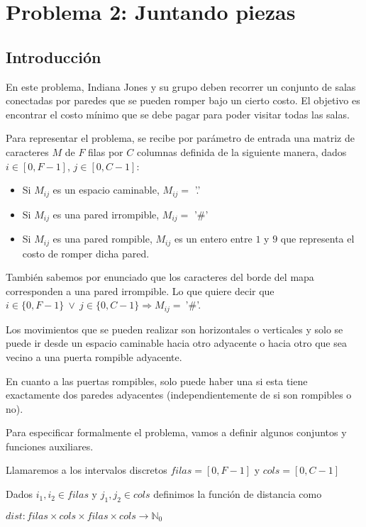 \section{Problema 2: Juntando piezas}

\subsection{Introducción}

En este problema, Indiana Jones y su grupo deben recorrer un conjunto de salas conectadas por paredes que se pueden romper bajo un cierto costo. El objetivo es encontrar el costo mínimo que se debe pagar para poder visitar todas las salas.

Para representar el problema, se recibe por parámetro de entrada una matriz de caracteres $M$ de $F$ filas por $C$ columnas definida de la siguiente manera, dados $i \in [0,F-1]$, $j \in [0,C-1]$:

\begin{itemize}
	\item Si $M_{ij}$ es un espacio caminable, $M_{ij} = $ '.'
	\item Si $M_{ij}$ es una pared irrompible, $M_{ij} = $ '$\#$'
	\item Si $M_{ij}$ es una pared rompible, $M_{ij}$ es un entero entre $1$ y $9$ que representa el costo de romper dicha pared.
\end{itemize}

También sabemos por enunciado que los caracteres del borde del mapa corresponden a una pared irrompible. Lo que quiere decir que $i \in \{0, F-1\} \ \vee \ j \in \{0, C-1\} \Rightarrow M_{ij} =\ $'$\#$'.

Los movimientos que se pueden realizar son horizontales o verticales y solo se puede ir desde un espacio caminable hacia otro adyacente o hacia otro que sea vecino a una puerta rompible adyacente.

En cuanto a las puertas rompibles, solo puede haber una si esta tiene exactamente dos paredes adyacentes (independientemente de si son rompibles o no).

Para especificar formalmente el problema, vamos a definir algunos conjuntos y funciones auxiliares.

Llamaremos a los intervalos discretos $filas = [0,F-1]$ y $cols = [0,C-1]$

Dados $i_1,i_2 \in filas$ y $j_1,j_2 \in cols$ definimos la función de distancia como

$dist: filas \times cols \times filas \times cols \rightarrow \mathbb{N}_0$

